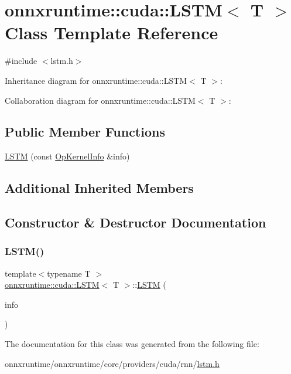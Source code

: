 \hypertarget{classonnxruntime_1_1cuda_1_1LSTM}{}\section{onnxruntime\+:\+:cuda\+:\+:L\+S\+TM$<$ T $>$ Class Template Reference}
\label{classonnxruntime_1_1cuda_1_1LSTM}


{\ttfamily \#include $<$lstm.\+h$>$}



Inheritance diagram for onnxruntime\+:\+:cuda\+:\+:L\+S\+TM$<$ T $>$\+:


Collaboration diagram for onnxruntime\+:\+:cuda\+:\+:L\+S\+TM$<$ T $>$\+:
\subsection*{Public Member Functions}
\begin{DoxyCompactItemize}
\item 
\mbox{\hyperlink{classonnxruntime_1_1cuda_1_1LSTM_ab98b953aa4bcc9fefaebfe52b395b6ba}{L\+S\+TM}} (const \mbox{\hyperlink{classonnxruntime_1_1OpKernelInfo}{Op\+Kernel\+Info}} \&info)
\end{DoxyCompactItemize}
\subsection*{Additional Inherited Members}


\subsection{Constructor \& Destructor Documentation}
\mbox{\label{classonnxruntime_1_1cuda_1_1LSTM_ab98b953aa4bcc9fefaebfe52b395b6ba}} 
\subsubsection{\texorpdfstring{L\+S\+T\+M()}{LSTM()}}
{\footnotesize\ttfamily template$<$typename T $>$ \\
\mbox{\hyperlink{classonnxruntime_1_1cuda_1_1LSTM}{onnxruntime\+::cuda\+::\+L\+S\+TM}}$<$ T $>$\+::\mbox{\hyperlink{classonnxruntime_1_1cuda_1_1LSTM}{L\+S\+TM}} (\begin{DoxyParamCaption}\item[{const \mbox{\hyperlink{classonnxruntime_1_1OpKernelInfo}{Op\+Kernel\+Info}} \&}]{info }\end{DoxyParamCaption})\hspace{0.3cm}{\ttfamily [inline]}}



The documentation for this class was generated from the following file\+:\begin{DoxyCompactItemize}
\item 
onnxruntime/onnxruntime/core/providers/cuda/rnn/\mbox{\hyperlink{lstm_8h}{lstm.\+h}}\end{DoxyCompactItemize}

